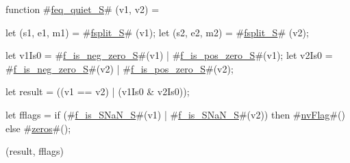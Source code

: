 function #\hyperref[sailRISCVzfeqzyquietzyS]{feq\_quiet\_S}#   (v1,       v2) = {
  let (s1, e1, m1) = #\hyperref[sailRISCVzfsplitzyS]{fsplit\_S}# (v1);
  let (s2, e2, m2) = #\hyperref[sailRISCVzfsplitzyS]{fsplit\_S}# (v2);

  let v1Is0    = #\hyperref[sailRISCVzfzyiszynegzyzzerozyS]{f\_is\_neg\_zero\_S}#(v1) | #\hyperref[sailRISCVzfzyiszyposzyzzerozyS]{f\_is\_pos\_zero\_S}#(v1);
  let v2Is0    = #\hyperref[sailRISCVzfzyiszynegzyzzerozyS]{f\_is\_neg\_zero\_S}#(v2) | #\hyperref[sailRISCVzfzyiszyposzyzzerozyS]{f\_is\_pos\_zero\_S}#(v2);

  let result = ((v1 == v2) | (v1Is0 & v2Is0));

  let fflags = if   (#\hyperref[sailRISCVzfzyiszySNaNzyS]{f\_is\_SNaN\_S}#(v1) | #\hyperref[sailRISCVzfzyiszySNaNzyS]{f\_is\_SNaN\_S}#(v2))
               then #\hyperref[sailRISCVznvFlag]{nvFlag}#()
               else #\hyperref[sailRISCVzzzeros]{zeros}#();

  (result, fflags)
}
